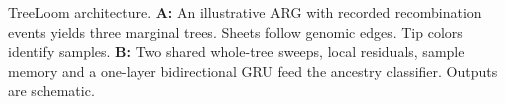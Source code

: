 TreeLoom architecture. \textbf{A:} An illustrative ARG with recorded recombination events yields three marginal trees. Sheets follow genomic edges. Tip colors identify samples. \textbf{B:} Two shared whole-tree sweeps, local residuals, sample memory and a one-layer bidirectional GRU feed the ancestry classifier. Outputs are schematic.
